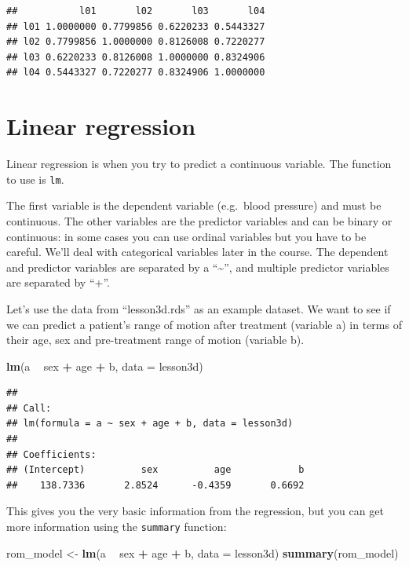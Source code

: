 \documentclass[]{book}
\newenvironment{Shaded}{\begin{snugshade}}{\end{snugshade}}
\newcommand{\DataTypeTok}[1]{\textcolor[rgb]{0.13,0.29,0.53}{#1}}
\newcommand{\KeywordTok}[1]{\textcolor[rgb]{0.13,0.29,0.53}{\textbf{#1}}}
\newcommand{\NormalTok}[1]{#1}
\newcommand{\OperatorTok}[1]{\textcolor[rgb]{0.81,0.36,0.00}{\textbf{#1}}}
\newcommand{\StringTok}[1]{\textcolor[rgb]{0.31,0.60,0.02}{#1}}
\begin{document}
\begin{verbatim}
##           l01       l02       l03       l04
## l01 1.0000000 0.7799856 0.6220233 0.5443327
## l02 0.7799856 1.0000000 0.8126008 0.7220277
## l03 0.6220233 0.8126008 1.0000000 0.8324906
## l04 0.5443327 0.7220277 0.8324906 1.0000000
\end{verbatim}

\hypertarget{linear-regression}{%
\section{Linear regression}\label{linear-regression}}

Linear regression is when you try to predict a continuous variable. The
function to use is \texttt{lm}.

The first variable is the dependent variable (e.g.~blood pressure) and
must be continuous. The other variables are the predictor variables and
can be binary or continuous: in some cases you can use ordinal variables
but you have to be careful. We'll deal with categorical variables later
in the course. The dependent and predictor variables are separated by a
``\textasciitilde{}'', and multiple predictor variables are separated by
``+''.

Let's use the data from ``lesson3d.rds'' as an example dataset. We want
to see if we can predict a patient's range of motion after treatment
(variable a) in terms of their age, sex and pre-treatment range of
motion (variable b).

\begin{Shaded}
\begin{Highlighting}[]
\KeywordTok{lm}\NormalTok{(a }\OperatorTok{~}\StringTok{ }\NormalTok{sex }\OperatorTok{+}\StringTok{ }\NormalTok{age }\OperatorTok{+}\StringTok{ }\NormalTok{b, }\DataTypeTok{data =}\NormalTok{ lesson3d)}
\end{Highlighting}
\end{Shaded}

\begin{verbatim}
## 
## Call:
## lm(formula = a ~ sex + age + b, data = lesson3d)
## 
## Coefficients:
## (Intercept)          sex          age            b  
##    138.7336       2.8524      -0.4359       0.6692
\end{verbatim}

This gives you the very basic information from the regression, but you
can get more information using the \texttt{summary} function:

\begin{Shaded}
\begin{Highlighting}[]
\NormalTok{rom_model <-}\StringTok{ }\KeywordTok{lm}\NormalTok{(a }\OperatorTok{~}\StringTok{ }\NormalTok{sex }\OperatorTok{+}\StringTok{ }\NormalTok{age }\OperatorTok{+}\StringTok{ }\NormalTok{b, }\DataTypeTok{data =}\NormalTok{ lesson3d)}
\KeywordTok{summary}\NormalTok{(rom_model)}
\end{Highlighting}
\end{Shaded}
\end{document}
